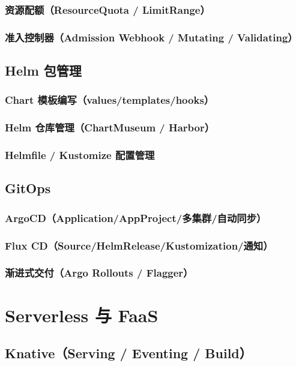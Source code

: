 \documentclass[12pt,UTF8]{ctexbook}
\begin{document}
    \subsection{资源配额（ResourceQuota / LimitRange）}
    \subsection{准入控制器（Admission Webhook / Mutating / Validating）}

  \section{Helm 包管理}
    \subsection{Chart 模板编写（values/templates/hooks）}
    \subsection{Helm 仓库管理（ChartMuseum / Harbor）}
    \subsection{Helmfile / Kustomize 配置管理}

  \section{GitOps}
    \subsection{ArgoCD（Application/AppProject/多集群/自动同步）}
    \subsection{Flux CD（Source/HelmRelease/Kustomization/通知）}
    \subsection{渐进式交付（Argo Rollouts / Flagger）}

\chapter{Serverless 与 FaaS}
\label{chap:serverless}

  \section{Knative（Serving / Eventing / Build）}
\end{document}
